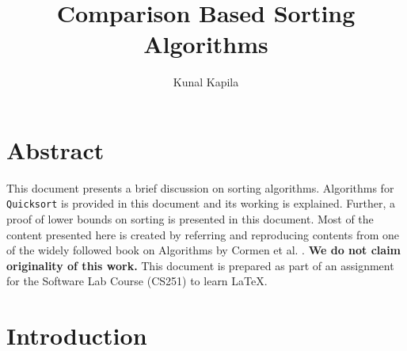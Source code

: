 \documentclass[a4paper,10pt]{article}
\begin{document}
\title{Comparison Based Sorting Algorithms}
\author{Kunal Kapila}
\date{}
\maketitle
\begin{multicols*}{2}
\section*{Abstract}
    This document presents a brief discussion on sorting algorithms. Algorithms for \texttt{Quicksort} is provided in this document and its working is explained. Further, a proof of lower bounds on sorting is presented in this document. Most of the content presented here is created by referring and reproducing contents from one of the widely followed book on Algorithms by Cormen et al. \cite{clrs}. \textbf{We do not claim originality of this work.} This document is prepared as part of an assignment for the Software Lab Course (CS251) to learn \LaTeX.

\section{Introduction}


\end{multicols*}
\end{document}
